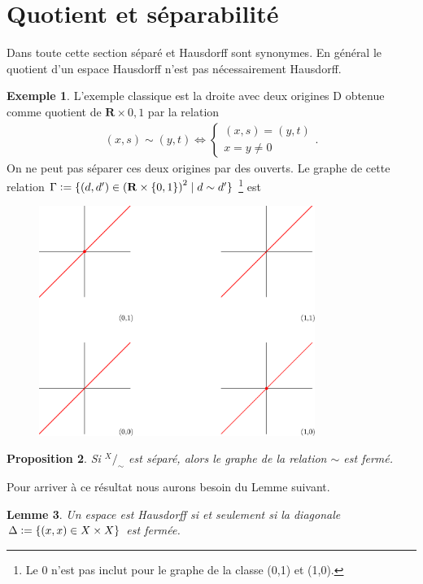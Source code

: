 \documentclass[12pt]{book}
\newcommand{\defeq}{\vcentcolon=}
\newtheorem{lemma}{Lemme}[section]
\newtheorem{prop}[lemma]{Proposition}
\theoremstyle{definition}
\newtheorem{example}[lemma]{Exemple}
\theoremstyle{remark}
\newcommand*\quot[2]{{^{\textstyle #1}\big/_{\textstyle #2}}}
\begin{document}
	\section{Quotient et séparabilité}
	Dans toute cette section séparé et Hausdorff sont synonymes. En général le quotient d'un espace Hausdorff n'est pas nécessairement Hausdorff.
	\begin{example}
		L'exemple classique est la droite avec deux origines D obtenue comme quotient de $\mathbf{R}\times {0,1}$ par la relation
		 \begin{align*}
			 (x,s) \sim (y,t) \iff \begin{cases}
				 (x,s) = (y,t) \\
				 x = y \neq 0
			 \end{cases}
		.\end{align*}
		On ne peut pas séparer ces deux origines par des ouverts. Le graphe de cette relation $\Gamma \defeq \{(d,d') \in {(\mathbf{R}\times \{0,1\})}^2  \;|\; d\sim d'\}$ \footnote{Le 0 n'est pas inclut pour le graphe de la classe (0,1) et (1,0).} est 
		\begin{figure}[ht]
			\centering
			\includegraphics[width=0.8\textwidth]{graph.eps}
		\end{figure}
	\end{example}
	\begin{prop}
		Si $\quot{X}{\sim}$ est séparé, alors le graphe de la relation  $\sim$ est fermé.
	\end{prop}
	Pour arriver à ce résultat nous aurons besoin du Lemme suivant.
	\begin{lemma}
		Un espace est Hausdorff si et seulement si la diagonale $\Delta \defeq \{(x,x) \in X \times X\}$ est fermée.
	\end{lemma}
\end{document}
